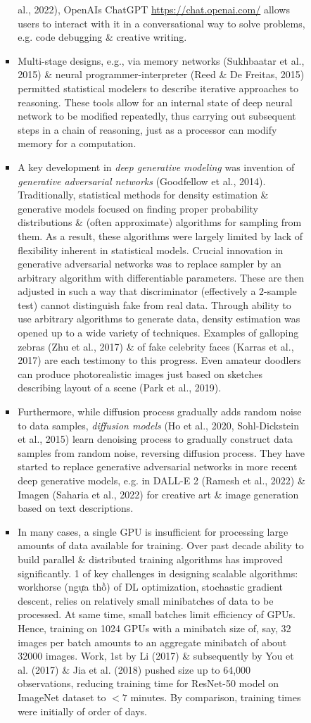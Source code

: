 \documentclass{article}
\begin{document}
\begin{enumerate}
\begin{itemize}
\begin{itemize}
\begin{itemize}
				al., 2022), OpenAIs ChatGPT \url{https://chat.openai.com/} allows users to interact with it in a conversational way to solve problems, e.g. code debugging \& creative writing.
				\item Multi-stage designs, e.g., via memory networks (Sukhbaatar et al., 2015) \& neural programmer-interpreter (Reed \& De Freitas, 2015) permitted statistical modelers to describe iterative approaches to reasoning. These tools allow for an internal state of deep neural network to be modified repeatedly, thus carrying out subsequent steps in a chain of reasoning, just as a processor can modify memory for a computation.
				\item A key development in {\it deep generative modeling} was invention of {\it generative adversarial networks} (Goodfellow et al., 2014). Traditionally, statistical methods for density estimation \& generative models focused on finding proper probability distributions \& (often approximate) algorithms for sampling from them. As a result, these algorithms were largely limited by lack of flexibility inherent in statistical models. Crucial innovation in generative adversarial networks was to replace sampler by an arbitrary algorithm with differentiable parameters. These are then adjusted in such a way that discriminator (effectively a 2-sample test) cannot distinguish fake from real data. Through ability to use arbitrary algorithms to generate data, density estimation was opened up to a wide variety of techniques. Examples of galloping zebras (Zhu et al., 2017) \& of fake celebrity faces (Karras et al., 2017) are each testimony to this progress. Even amateur doodlers can produce photorealistic images just based on sketches describing layout of a scene (Park et al., 2019).
				\item Furthermore, while diffusion process gradually adds random noise to data samples, {\it diffusion models} (Ho et al., 2020, Sohl-Dickstein et al., 2015) learn denoising process to gradually construct data samples from random noise, reversing diffusion process. They have started to replace generative adversarial networks in more recent deep generative models, e.g. in DALL-E 2 (Ramesh et al., 2022) \& Imagen (Saharia et al., 2022) for creative art \& image generation based on text descriptions.
				\item In many cases, a single GPU is insufficient for processing large amounts of data available for training. Over past decade ability to build parallel \& distributed training algorithms has improved significantly. 1 of key challenges in designing scalable algorithms: workhorse (ngựa thồ) of DL optimization, stochastic gradient descent, relies on relatively small minibatches of data to be processed. At same time, small batches limit efficiency of GPUs. Hence, training on 1024 GPUs with a minibatch size of, say, 32 images per batch amounts to an aggregate minibatch of about 32000 images. Work, 1st by Li (2017) \& subsequently by You et al. (2017) \& Jia et al. (2018) pushed size up to 64,000 observations, reducing training time for ResNet-50 model on ImageNet dataset to $< 7$ minutes. By comparison, training times were initially of order of days.

\end{itemize}
\end{itemize}
\end{itemize}
\end{enumerate}
\end{document}
